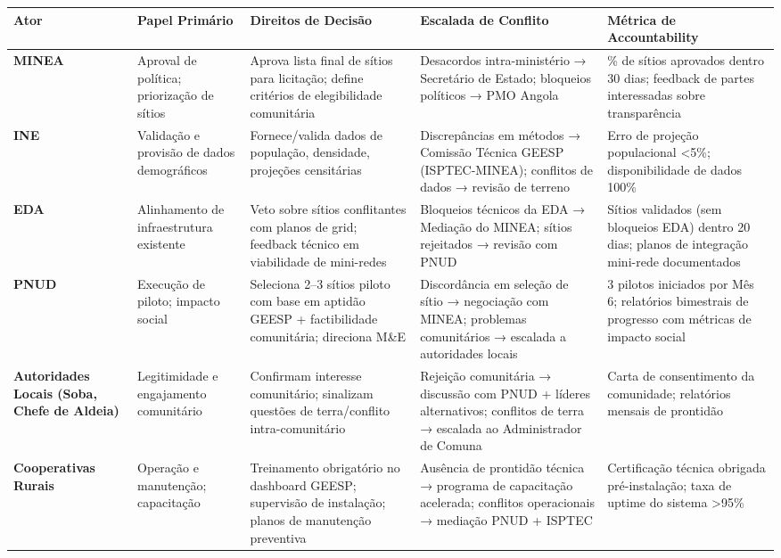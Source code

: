 \documentclass[12pt, a4paper]{article}
\begin{document}
\begin{table}[h!]
\centering
\renewcommand{\arraystretch}{1.35}
\begin{tabularx}{\textwidth}{|l|l|l|l|l|}
\hline
\textbf{Ator} & \textbf{Papel Primário} & \textbf{Direitos de Decisão} & \textbf{Escalada de Conflito} & \textbf{Métrica de Accountability} \\
\hline
\textbf{MINEA} & Aproval de política; priorização de sítios & Aprova lista final de sítios para licitação; define critérios de elegibilidade comunitária & Desacordos intra-ministério → Secretário de Estado; bloqueios políticos → PMO Angola & \% de sítios aprovados dentro 30 dias; feedback de partes interessadas sobre transparência \\
\hline
\textbf{INE} & Validação e provisão de dados demográficos & Fornece/valida dados de população, densidade, projeções censitárias & Discrepâncias em métodos → Comissão Técnica GEESP (ISPTEC-MINEA); conflitos de dados → revisão de terreno & Erro de projeção populacional <5\%; disponibilidade de dados 100\% \\
\hline
\textbf{EDA} & Alinhamento de infraestrutura existente & Veto sobre sítios conflitantes com planos de grid; feedback técnico em viabilidade de mini-redes & Bloqueios técnicos da EDA → Mediação do MINEA; sítios rejeitados → revisão com PNUD & Sítios validados (sem bloqueios EDA) dentro 20 dias; planos de integração mini-rede documentados \\
\hline
\textbf{PNUD} & Execução de piloto; impacto social & Seleciona 2--3 sítios piloto com base em aptidão GEESP + factibilidade comunitária; direciona M\&E & Discordância em seleção de sítio → negociação com MINEA; problemas comunitários → escalada a autoridades locais & 3 pilotos iniciados por Mês 6; relatórios bimestrais de progresso com métricas de impacto social \\
\hline
\textbf{Autoridades Locais (Soba, Chefe de Aldeia)} & Legitimidade e engajamento comunitário & Confirmam interesse comunitário; sinalizam questões de terra/conflito intra-comunitário & Rejeição comunitária → discussão com PNUD + líderes alternativos; conflitos de terra → escalada ao Administrador de Comuna & Carta de consentimento da comunidade; relatórios mensais de prontidão \\
\hline
\textbf{Cooperativas Rurais} & Operação e manutenção; capacitação & Treinamento obrigatório no dashboard GEESP; supervisão de instalação; planos de manutenção preventiva & Ausência de prontidão técnica → programa de capacitação acelerada; conflitos operacionais → mediação PNUD + ISPTEC & Certificação técnica obrigada pré-instalação; taxa de uptime do sistema >95\% \\

\end{tabularx}
\end{table}
\end{document}
